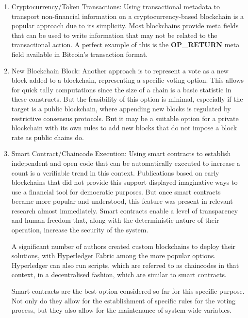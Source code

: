 \documentclass[../access.tex]{subfiles}
\begin{document}
\begin{enumerate}
    \item{Cryptocurrency/Token Transactions:}
          Using transactional metadata to transport non-financial information on a cryptocurrency-based blockchain is a popular approach due to its simplicity. Most blockchains provide meta fields that can be used to write information that may not be related to the transactional action. A perfect example of this is the \textbf{OP\_RETURN} meta field available in Bitcoin's transaction format.

    \item{New Blockchain Block:}
          Another approach is to represent a vote as a new block added to a blockchain, representing a specific voting option. This allows for quick tally computations since the size of a chain is a basic statistic in these constructs. But the feasibility of this option is minimal, especially if the target is a public blockchain, where appending new blocks is regulated by restrictive consensus protocols. But it may be a suitable option for a private blockchain with its own rules to add new blocks that do not impose a block rate as public chains do.

    \item{Smart Contract/Chaincode Execution:}
          Using smart contracts to establish independent and open code that can be automatically executed to increase a count is a verifiable trend in this context. Publications based on early blockchains that did not provide this support displayed imaginative ways to use a financial tool for democratic purposes. But once smart contracts became more popular and understood, this feature was present in relevant research almost immediately. Smart contracts enable a level of transparency and human freedom that, along with the deterministic nature of their operation, increase the security of the system.
          \par
          A significant number of authors created custom blockchains to deploy their solutions, with Hyperledger Fabric among the more popular options. Hyperledger can also run scripts, which are referred to as chaincodes in that context, in a decentralised fashion, which are similar to smart contracts.
          \par
          Smart contracts are the best option considered so far for this specific purpose. Not only do they allow for the establishment of specific rules for the voting process, but they also allow for the maintenance of system-wide variables.
\end{enumerate}
\end{document}
